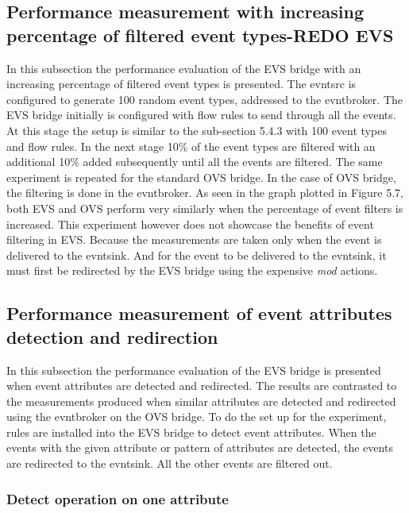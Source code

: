 \subsection{Performance measurement with increasing percentage of filtered event types-REDO EVS}
In this subsection the performance evaluation of the EVS bridge with an increasing percentage of filtered event types is presented. The evntsrc is configured to generate 100 random event types, addressed to the evntbroker. The EVS bridge initially is configured with flow rules to send through all the events. At this stage the setup is similar to the sub-section 5.4.3 with 100 event types and flow rules. In the next stage 10\% of the event types are filtered with an additional 10\% added subsequently until all the events are filtered. The same experiment is repeated for the standard OVS bridge. In the case of OVS bridge, the filtering is done in the evntbroker. 
\newline
As seen in the graph plotted in Figure 5.7, both EVS and OVS perform very similarly when the percentage of event filters is increased. This  experiment however does not showcase the benefits of event filtering in EVS. Because the measurements are taken only when the event is delivered to the evntsink. And for the event to be delivered to the evntsink, it must first be redirected by the EVS bridge using the expensive \textit{mod} actions. 





\subsection{Performance measurement of event attributes detection and redirection}
In this subsection the performance evaluation of the EVS bridge is presented when event attributes are detected and redirected. The results are contrasted to the measurements produced when similar attributes are detected and redirected using the evntbroker on the OVS bridge. To do the set up for the experiment, rules are installed into the EVS bridge to detect event attributes. When the events with the given attribute or pattern of attributes are detected, the events are redirected to the evntsink. All the other events are filtered out. 

\subsubsection{Detect operation on one attribute}

